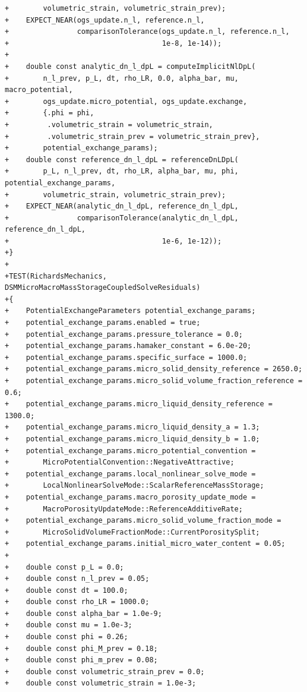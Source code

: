 \documentclass[10pt]{article}
\begin{document}
\begin{lstlisting}
+        volumetric_strain, volumetric_strain_prev);
+    EXPECT_NEAR(ogs_update.n_l, reference.n_l,
+                comparisonTolerance(ogs_update.n_l, reference.n_l,
+                                    1e-8, 1e-14));
+
+    double const analytic_dn_l_dpL = computeImplicitNlDpL(
+        n_l_prev, p_L, dt, rho_LR, 0.0, alpha_bar, mu, macro_potential,
+        ogs_update.micro_potential, ogs_update.exchange,
+        {.phi = phi,
+         .volumetric_strain = volumetric_strain,
+         .volumetric_strain_prev = volumetric_strain_prev},
+        potential_exchange_params);
+    double const reference_dn_l_dpL = referenceDnLDpL(
+        p_L, n_l_prev, dt, rho_LR, alpha_bar, mu, phi, potential_exchange_params,
+        volumetric_strain, volumetric_strain_prev);
+    EXPECT_NEAR(analytic_dn_l_dpL, reference_dn_l_dpL,
+                comparisonTolerance(analytic_dn_l_dpL, reference_dn_l_dpL,
+                                    1e-6, 1e-12));
+}
+
+TEST(RichardsMechanics, DSMMicroMacroMassStorageCoupledSolveResiduals)
+{
+    PotentialExchangeParameters potential_exchange_params;
+    potential_exchange_params.enabled = true;
+    potential_exchange_params.pressure_tolerance = 0.0;
+    potential_exchange_params.hamaker_constant = 6.0e-20;
+    potential_exchange_params.specific_surface = 1000.0;
+    potential_exchange_params.micro_solid_density_reference = 2650.0;
+    potential_exchange_params.micro_solid_volume_fraction_reference = 0.6;
+    potential_exchange_params.micro_liquid_density_reference = 1300.0;
+    potential_exchange_params.micro_liquid_density_a = 1.3;
+    potential_exchange_params.micro_liquid_density_b = 1.0;
+    potential_exchange_params.micro_potential_convention =
+        MicroPotentialConvention::NegativeAttractive;
+    potential_exchange_params.local_nonlinear_solve_mode =
+        LocalNonlinearSolveMode::ScalarReferenceMassStorage;
+    potential_exchange_params.macro_porosity_update_mode =
+        MacroPorosityUpdateMode::ReferenceAdditiveRate;
+    potential_exchange_params.micro_solid_volume_fraction_mode =
+        MicroSolidVolumeFractionMode::CurrentPorositySplit;
+    potential_exchange_params.initial_micro_water_content = 0.05;
+
+    double const p_L = 0.0;
+    double const n_l_prev = 0.05;
+    double const dt = 100.0;
+    double const rho_LR = 1000.0;
+    double const alpha_bar = 1.0e-9;
+    double const mu = 1.0e-3;
+    double const phi = 0.26;
+    double const phi_M_prev = 0.18;
+    double const phi_m_prev = 0.08;
+    double const volumetric_strain_prev = 0.0;
+    double const volumetric_strain = 1.0e-3;

\end{lstlisting}
\end{document}
